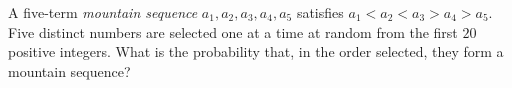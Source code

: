 A five-term \emph{mountain sequence} $a_1,a_2,a_3,a_4,a_5$ satisfies $a_1<a_2<a_3>a_4>a_5$. Five distinct numbers are selected one at a time at random from the first $20$ positive integers. What is the probability that, in the order selected, they form a mountain sequence?
